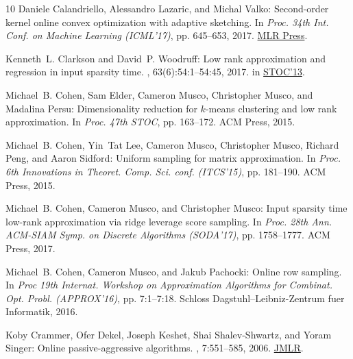 \documentclass[11pt]{article}
\numberwithin{equation}{section}
\theoremstyle{definition}
\theoremstyle{plain}
\begin{document}
\begin{thebibliography}{10}
{\sc Daniele Calandriello, Alessandro Lazaric, and Michal Valko}: Second-order
  kernel online convex optimization with adaptive sketching.
\newblock In {\em Proc. 34th Int. Conf. on Machine Learning (ICML'17)}, pp.
  645--653, 2017.
\newblock \href{http://proceedings.mlr.press/v70/calandriello17a.html}{MLR
  Press}.

{\sc Kenneth~L. Clarkson and David~P. Woodruff}: Low rank approximation and
  regression in input sparsity time.
, 63(6):54:1--54:45, 2017.
\newblock \prelim in \href{https://doi.org/10.1145/2488608.2488620}{STOC'13}.

{\sc Michael~B. Cohen, Sam Elder, Cameron Musco, Christopher Musco, and
  Madalina Persu}: Dimensionality reduction for $k$-means clustering and low
  rank approximation.
\newblock In {\em Proc. 47th STOC}, pp. 163--172. ACM Press, 2015.

{\sc Michael~B. Cohen, Yin~Tat Lee, Cameron Musco, Christopher Musco, Richard
  Peng, and Aaron Sidford}: Uniform sampling for matrix approximation.
\newblock In {\em Proc. 6th Innovations in Theoret. Comp. Sci. conf.
  (ITCS'15)}, pp. 181--190. ACM Press, 2015.

{\sc Michael~B. Cohen, Cameron Musco, and Christopher Musco}: Input sparsity
  time low-rank approximation via ridge leverage score sampling.
\newblock In {\em Proc. 28th Ann. ACM-SIAM Symp. on Discrete Algorithms
  (SODA'17)}, pp. 1758--1777. ACM Press, 2017.

{\sc Michael~B. Cohen, Cameron Musco, and Jakub Pachocki}: Online row sampling.
\newblock In {\em Proc 19th Internat. Workshop on Approximation Algorithms for
  Combinat. Opt. Probl. (APPROX'16)}, pp. 7:1--7:18. Schloss
  Dagstuhl--Leibniz-Zentrum fuer Informatik, 2016.

{\sc Koby Crammer, Ofer Dekel, Joseph Keshet, Shai Shalev-Shwartz, and Yoram
  Singer}: Online passive-aggressive algorithms.
, 7:551--585, 2006.
\newblock
  \href{http://jmlr.csail.mit.edu/papers/volume7/crammer06a/crammer06a.pdf}{JMLR}.


\end{thebibliography}
\end{document}
